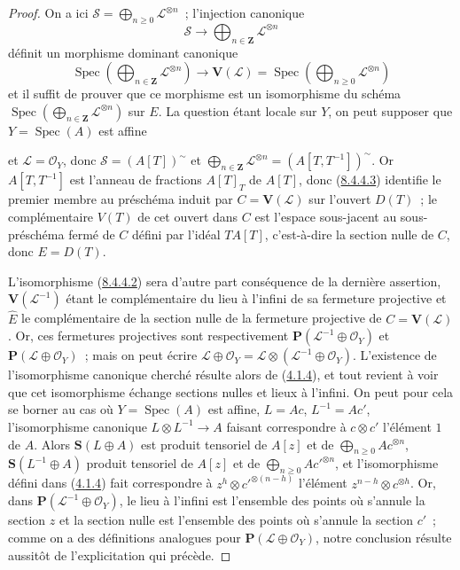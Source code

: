 \begin{proof}
On a ici
$\mathcal{S}=\bigoplus_{n\geq0}\mathcal{L}^{\otimes n}$~; l'injection
canonique
\[
  \mathcal{S}\to\bigoplus_{n\in\mathbf{Z}}\mathcal{L}^{\otimes n}
\]
définit un morphisme dominant canonique
\begin{equation}
\label{II.8.4.4.3-fr}
  \operatorname{Spec}\left(
    \bigoplus_{n\in\mathbf{Z}}\mathcal{L}^{\otimes n}
  \right)
  \to\mathbf{V}(\mathcal{L})
  =\operatorname{Spec}\left(
    \bigoplus_{n\geq0}\mathcal{L}^{\otimes n}
  \right)
\tag{8.4.4.3}
\end{equation}
et il suffit de prouver que ce morphisme est un isomorphisme du schéma
$\operatorname{Spec}(\bigoplus_{n\in\mathbf{Z}}\mathcal{L}^{\otimes n})$
sur $E$. La question étant locale sur $Y$, on peut supposer que
$Y=\operatorname{Spec}(A)$ est affine

et $\mathcal{L}=\mathcal{O}_Y$, donc $\mathcal{S}=(A[T])^{\sim}$ et
$\bigoplus_{n\in\mathbf{Z}}\mathcal{L}^{\otimes n}
=(A[T,T^{-1}])^{\sim}$. Or $A[T,T^{-1}]$ est l'anneau de fractions
$A[T]_T$ de $A[T]$, donc (\hyperref[II.8.4.4.3-fr]{8.4.4.3}) identifie le
premier membre au préschéma induit par $C=\mathbf{V}(\mathcal{L})$ sur
l'ouvert $D(T)$~; le complémentaire $V(T)$ de cet ouvert dans $C$ est
l'espace sous-jacent au sous-préschéma fermé de $C$ défini par l'idéal
$TA[T]$, c'est-à-dire la section nulle de $C$, donc $E=D(T)$.

L'isomorphisme (\hyperref[II.8.4.4.2-fr]{8.4.4.2}) sera d'autre part
conséquence de la dernière assertion, $\mathbf{V}(\mathcal{L}^{-1})$ étant le
complémentaire du lieu à l'infini de sa fermeture projective et $\widehat{E}$
le complémentaire de la section nulle de la fermeture projective de
$C=\mathbf{V}(\mathcal{L})$. Or, ces fermetures projectives sont
respectivement $\mathbf{P}(\mathcal{L}^{-1}\oplus\mathcal{O}_Y)$ et
$\mathbf{P}(\mathcal{L}\oplus\mathcal{O}_Y)$~; mais on peut écrire
$\mathcal{L}\oplus\mathcal{O}_Y
=\mathcal{L}\otimes(\mathcal{L}^{-1}\oplus\mathcal{O}_Y)$. L'existence de
l'isomorphisme canonique cherché résulte alors de
(\hyperref[II.4.1.4-fr]{4.1.4}), et tout revient à voir que cet isomorphisme
échange sections nulles et lieux à l'infini. On peut pour cela se borner au
cas où $Y=\operatorname{Spec}(A)$ est affine,
$L=Ac$, $L^{-1}=Ac'$, l'isomorphisme canonique
$L\otimes L^{-1}\to A$ faisant correspondre à $c\otimes c'$ l'élément $1$
de $A$. Alors $\mathbf{S}(L\oplus A)$ est produit tensoriel de $A[z]$ et de
$\bigoplus_{n\geq0}Ac^{\otimes n}$, $\mathbf{S}(L^{-1}\oplus A)$ produit
tensoriel de $A[z]$ et de $\bigoplus_{n\geq0}Ac'^{\otimes n}$, et
l'isomorphisme défini dans (\hyperref[II.4.1.4-fr]{4.1.4}) fait correspondre à
$z^h\otimes c'^{\otimes(n-h)}$ l'élément
$z^{n-h}\otimes c^{\otimes h}$. Or, dans
$\mathbf{P}(\mathcal{L}^{-1}\oplus\mathcal{O}_Y)$, le lieu à l'infini est
l'ensemble des points où s'annule la section $z$ et la section nulle est
l'ensemble des points où s'annule la section $c'$~; comme on a des définitions
analogues pour $\mathbf{P}(\mathcal{L}\oplus\mathcal{O}_Y)$, notre conclusion
résulte aussitôt de l'explicitation qui précède.
\end{proof}

